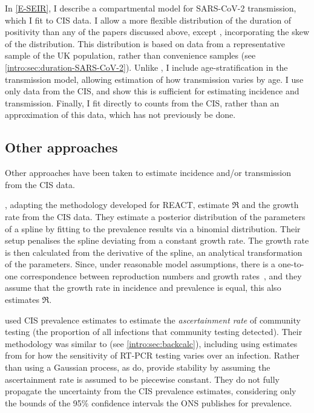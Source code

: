 \documentclass[thesis.tex]{subfiles}
\begin{document}
In \cref{E-SEIR}, I describe a compartmental model for SARS-CoV-2 transmission, which I fit to CIS data.
I allow a more flexible distribution of the duration of positivity than any of the papers discussed above, except \textcite{nicholsonImproving}, incorporating the skew of the distribution.
This distribution is based on data from a representative sample of the UK population, rather than convenience samples (see \cref{intro:sec:duration-SARS-CoV-2}).
Unlike \textcite{nicholsonImproving}, I include age-stratification in the transmission model, allowing estimation of how transmission varies by age.
I use only data from the CIS, and show this is sufficient for estimating incidence and transmission.
Finally, I fit directly to counts from the CIS, rather than an approximation of this data, which has not previously be done.

\subsection{Other approaches}

Other approaches have been taken to estimate incidence and/or transmission from the CIS data.

\Textcite{mccabeCISincidence}, adapting the methodology \textcite{ealesAppropriately} developed for REACT, estimate $\Re$ and the growth rate from the CIS data.
They estimate a posterior distribution of the parameters of a spline by fitting to the prevalence results via a binomial distribution.
Their setup penalises the spline deviating from a constant growth rate.
The growth rate is then calculated from the derivative of the spline, an analytical transformation of the parameters.
Since, under reasonable model assumptions, there is a one-to-one correspondence between reproduction numbers and growth rates~\autocite{wallingaGI}, and they assume that the growth rate in incidence and prevalence is equal, this also estimates $\Re$.

\Textcite{colmanAscertainment} used CIS prevalence estimates to estimate the \emph{ascertainment rate} of community testing (the proportion of all infections that community testing detected).
Their methodology was similar to \textcite{abbottCISincidence} (see \cref{intro:sec:backcalc}), including using estimates from \textcite{hellewellPCRSensitivity} for how the sensitivity of RT-PCR testing varies over an infection.
Rather than using a Gaussian process, as \textcite{abbottCISincidence} do, \textcite{colmanAscertainment} provide stability by assuming the ascertainment rate is assumed to be piecewise constant.
They do not fully propagate the uncertainty from the CIS prevalence estimates, considering only the bounds of the 95\% confidence intervals the ONS publishes for prevalence.
\end{document}
